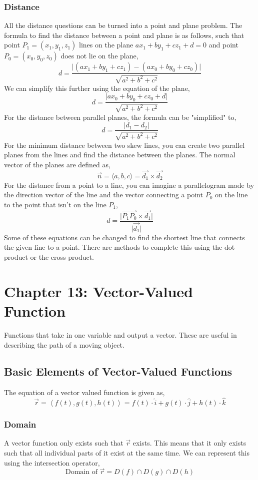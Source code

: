 \documentclass{article}
\begin{document}
\subsubsection{Distance}
All the distance questions can be turned into a point and plane problem. The formula to find the distance between a point and plane is as follows, such that point $P_1 = (x_1,y_1,z_1)$ lines on the plane $ax_1+by_1+cz_1+d=0$ and point $P_0 = (x_0,y_0,z_0)$ does not lie on the plane,
$$d = \frac{\lvert (ax_1+by_1+cz_1) - (ax_0+by_0+cz_0)\rvert}{\sqrt{a^2+b^2+c^2}}$$
We can simplify this further using the equation of the plane,
$$d = \frac{\lvert ax_0+by_0+cz_0+d\rvert}{\sqrt{a^2+b^2+c^2}}$$
For the distance between parallel planes, the formula can be "simplified" to,
$$d = \frac{\lvert d_1-d_2\rvert}{\sqrt{a^2+b^2+c^2}}$$
For the minimum distance between two skew lines, you can create two parallel planes from the lines and find the distance between the planes. The normal vector of the planes are defined as,
$$\vec{n} = \langle a,b,c \rangle = \vec{d_1} \times \vec{d_2}$$
For the distance from a point to a line, you can imagine a parallelogram made by the direction vector of the line and the vector connecting a point $P_0$ on the line to the point that isn't on the line $P_1$,
$$d = \frac{\lvert \overrightarrow{P_1P_0} \times \vec{d_1} \rvert}{\lvert \vec{d_1} \rvert}$$
Some of these equations can be changed to find the shortest line that connects the given line to a point. There are methods to complete this using the dot product or the cross product. 


\section{Chapter 13: Vector-Valued Function}
Functions that take in one variable and output a vector. These are useful in describing the path of a moving object. 

\subsection{Basic Elements of Vector-Valued Functions}
The equation of a vector valued function is given as,
$$\vec{r} = \left\langle f(t), g(t), h(t) \right\rangle = f(t)\cdot\hat{i} + g(t)\cdot\hat{j} + h(t)\cdot\hat{k}$$

\subsubsection{Domain}
A vector function only exists such that $\vec{r}$ exists.  This means that it only exists such that all individual parts of it exist at the same time. We can represent this using the intersection operator,
$$\text{Domain of }\vec{r} = D(f) \cap D(g) \cap D(h)$$
\end{document}
